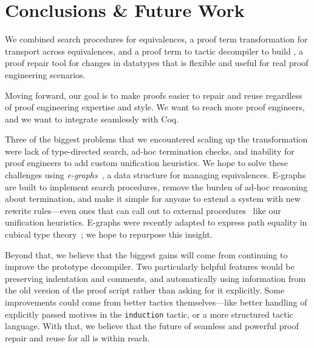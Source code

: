 \section{Conclusions \& Future Work}
\label{sec:discussion}

We combined search procedures for equivalences, a proof term transformation for transport across equivalences,
and a proof term to tactic decompiler to build \toolname,
a proof repair tool for changes in datatypes that is flexible and useful for real proof engineering scenarios.


Moving forward, our goal is to make proofs easier to repair and reuse regardless of proof engineering expertise and style.
We want to reach more proof engineers, and we want \toolname to integrate seamlessly with Coq.

Three of the biggest problems that we encountered scaling up the \toolname transformation were lack of type-directed search,
ad-hoc termination checks, and inability for proof engineers to add custom unification heuristics.
We hope to solve these challenges using \textit{e-graphs}~\cite{egraph1},
a data structure %
for managing equivalences.
E-graphs are built to implement search procedures,
remove the burden of ad-hoc reasoning about termination,
and make it simple for anyone to extend a system with new
rewrite rules---even ones that can call out to external procedures~\cite{egraph5} 
like our unification heuristics.
E-graphs were recently adapted to express path equality in cubical type theory~\cite{egraph6}; we hope to repurpose this insight.

Beyond that, we believe that the biggest gains will come from continuing to improve the prototype decompiler.
Two particularly helpful features would be preserving indentation and comments, and automatically using information from the old 
version of the proof script rather than asking for it explicitly.
Some improvements could come from better tactics themselves---like better handling of explicitly passed 
motives in the \lstinline{induction} tactic, or a more structured tactic language.
With that, we believe that the future of seamless and powerful proof repair and reuse for all is within reach.



